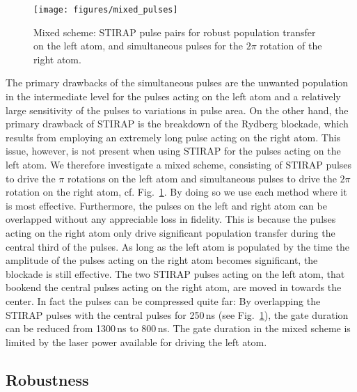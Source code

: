 \begin{figure}[tb]
  \begin{center}
    \texttt{[image: figures/mixed\_pulses]}
  \end{center}
  \caption{%
    Mixed scheme: STIRAP pulse pairs for robust population
    transfer on the left atom, and simultaneous pulses for the $2\pi$
    rotation of the right atom.
  }
  \label{fig:mixed}
\end{figure}
The primary drawbacks of the simultaneous pulses are the
unwanted population in the intermediate level for the pulses acting on
the left atom and a relatively large sensitivity of
the pulses to variations in pulse area.
On the other hand, the primary drawback
of STIRAP is the breakdown of the Rydberg blockade, which
results from employing an extremely long  pulse acting on the right
atom. This issue, however, is  not present when using STIRAP for the
pulses acting on the left atom. We therefore investigate a mixed
scheme, consisting of STIRAP pulses to drive the $\pi$ rotations on
the left atom and simultaneous pulses to drive the $2\pi$ rotation on
the right atom, cf. Fig.~\ref{fig:mixed}. By doing so we
use each method where it is most effective.
Furthermore, the pulses on the left and right atom can be overlapped
without any appreciable loss in fidelity. This is because the
pulses acting on the right atom only drive significant population
transfer during the central third of the pulses. As long as the left
atom is populated by the time the amplitude of the pulses acting on
the right atom becomes significant, the blockade is still effective. The two
STIRAP pulses acting on the left atom, that bookend the central pulses
acting on the right atom, are moved in towards the center.
In fact the pulses can be compressed
quite far: By overlapping the STIRAP pulses
with the central pulses for 250$\,$ns (see Fig.~\ref{fig:mixed}),
the gate duration can be
reduced from 1300$\,$ns to 800$\,$ns. The gate duration in the mixed scheme is
limited by the laser power available for driving the left atom.

\subsection{Robustness}
\label{subsec:RydRobust}

